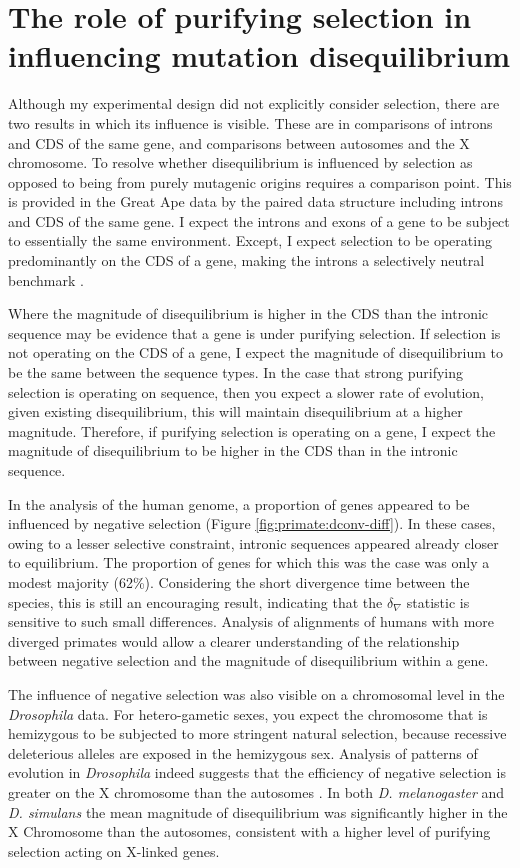 \section{The role of purifying selection in influencing mutation disequilibrium}

Although my experimental design did not explicitly consider selection, there are two results in which its influence is visible. These are in comparisons of introns and CDS of the same gene, and comparisons between autosomes and the X chromosome. To resolve whether disequilibrium is influenced by selection as opposed to being from purely mutagenic origins requires a comparison point. This is provided in the Great Ape data by the paired data structure including introns and CDS of the same gene. I expect the introns and exons of a gene to be subject to essentially the same environment. Except, I expect selection to be operating predominantly on the CDS of a gene, making the introns a selectively neutral benchmark \citep{Graur2013OnENCODE}. 

Where the magnitude of disequilibrium is higher in the CDS than the intronic sequence may be evidence that a gene is under purifying selection. If selection is not operating on the CDS of a gene, I expect the magnitude of disequilibrium to be the same between the sequence types. In the case that strong purifying selection is operating on sequence, then you expect a slower rate of evolution, given existing disequilibrium, this will maintain disequilibrium at a higher magnitude. Therefore, if purifying selection is operating on a gene, I expect the magnitude of disequilibrium to be higher in the CDS than in the intronic sequence.  

In the analysis of the human genome, a proportion of genes appeared to be influenced by negative selection (Figure \ref{fig:primate:dconv-diff}). In these cases, owing to a lesser selective constraint, intronic sequences appeared already closer to equilibrium. The proportion of genes for which this was the case was only a modest majority (62\%). Considering the short divergence time between the species, this is still an encouraging result, indicating that the $\delta_\nabla$ statistic is sensitive to such small differences. Analysis of alignments of humans with more diverged primates would allow a clearer understanding of the relationship between negative selection and the magnitude of disequilibrium within a gene. 

The influence of negative selection was also visible on a chromosomal level in the \textit{Drosophila} data. For hetero-gametic sexes, you expect the chromosome that is hemizygous to be subjected to more stringent natural selection, because recessive deleterious alleles are exposed in the hemizygous sex. Analysis of patterns of evolution in \textit{Drosophila} indeed suggests that the efficiency of negative selection is greater on the X chromosome than the autosomes \citep{Singh2008ContrastingDrosophila}. In both \textit{D. melanogaster} and \textit{D. simulans} the mean magnitude of disequilibrium was significantly higher in the X Chromosome than the autosomes, consistent with a higher level of purifying selection acting on X-linked genes. 

